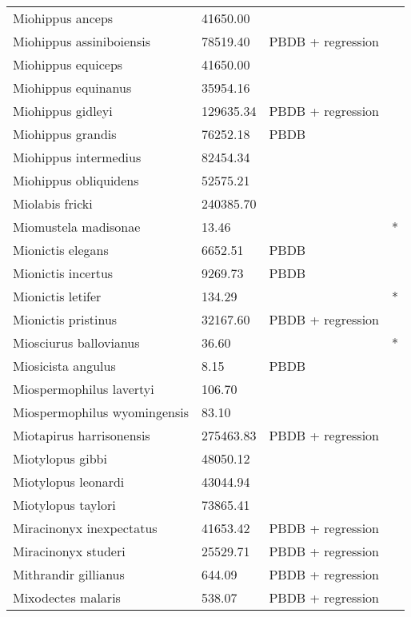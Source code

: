 \documentclass{article}
\begin{document}
\begin{center}
\begin{longtable}{p{} p{} p{} p{}}
    Miohippus anceps & 41650.00 & \cite{McKenna2011} &  \\ 
    Miohippus assiniboiensis & 78519.40 & PBDB + regression &  \\ 
    Miohippus equiceps & 41650.00 & \cite{McKenna2011} &  \\ 
    Miohippus equinanus & 35954.16 & \cite{Tomiya2013} &  \\ 
    Miohippus gidleyi & 129635.34 & PBDB + regression &  \\ 
    Miohippus grandis & 76252.18 & PBDB &  \\ 
    Miohippus intermedius & 82454.34 & \cite{Tomiya2013} &  \\ 
    Miohippus obliquidens & 52575.21 & \cite{Tomiya2013} &  \\ 
    Miolabis fricki & 240385.70 & \cite{Tomiya2013} &  \\ 
    Miomustela madisonae & 13.46 & \cite{Tomiya2013} & * \\ 
    Mionictis elegans & 6652.51 & PBDB &  \\ 
    Mionictis incertus & 9269.73 & PBDB &  \\ 
    Mionictis letifer & 134.29 & \cite{Tomiya2013} & * \\ 
    Mionictis pristinus & 32167.60 & PBDB + regression &  \\ 
    Miosciurus ballovianus & 36.60 & \cite{Tomiya2013} & * \\ 
    Miosicista angulus & 8.15 & PBDB &  \\ 
    Miospermophilus lavertyi & 106.70 & \cite{Tomiya2013} &  \\ 
    Miospermophilus wyomingensis & 83.10 & \cite{Tomiya2013} &  \\ 
    Miotapirus harrisonensis & 275463.83 & PBDB + regression &  \\ 
    Miotylopus gibbi & 48050.12 & \cite{Tomiya2013} &  \\ 
    Miotylopus leonardi & 43044.94 & \cite{Tomiya2013} &  \\ 
    Miotylopus taylori & 73865.41 & \cite{Tomiya2013} &  \\ 
    Miracinonyx inexpectatus & 41653.42 & PBDB + regression &  \\ 
    Miracinonyx studeri & 25529.71 & PBDB + regression &  \\ 
    Mithrandir gillianus & 644.09 & PBDB + regression &  \\ 
    Mixodectes malaris & 538.07 & PBDB + regression &  \\ 

\end{longtable}
\end{center}
\end{document}
